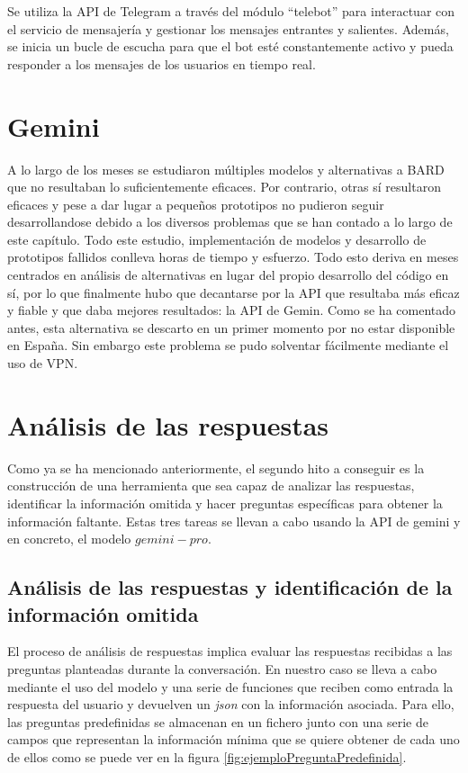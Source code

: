 Se utiliza la API de Telegram a través del módulo ``telebot'' para interactuar con el servicio de mensajería y gestionar los mensajes entrantes y salientes. Además, se inicia un bucle de escucha para que el bot esté constantemente activo y pueda responder a los mensajes de los usuarios en tiempo real.

\section{Gemini}

A lo largo de los meses se estudiaron múltiples modelos y alternativas a BARD que no resultaban lo suficientemente eficaces. Por contrario, otras sí resultaron eficaces y pese a dar lugar a pequeños prototipos no pudieron seguir desarrollandose debido a los diversos problemas que se han contado a lo largo de este capítulo. Todo este estudio, implementación de modelos y desarrollo de prototipos fallidos conlleva horas de tiempo y esfuerzo. Todo esto deriva en meses centrados en análisis de alternativas en lugar del propio desarrollo del código en sí, por lo que finalmente hubo que decantarse por la API que resultaba más eficaz y fiable y que daba mejores resultados: la API de Gemin. Como se ha comentado antes, esta alternativa se descarto en un primer momento por no estar disponible en España. Sin embargo este problema se pudo solventar fácilmente mediante el uso de VPN. 

\section{Análisis de las respuestas}
Como ya se ha mencionado anteriormente, el segundo hito a conseguir es la construcción de una herramienta que sea capaz de analizar las respuestas, identificar la información omitida y hacer preguntas específicas para obtener la información faltante. Estas tres tareas se llevan a cabo usando la API de gemini y en concreto, el modelo $gemini-pro$. 

\subsection{Análisis de las respuestas y identificación de la información omitida}
El proceso de análisis de respuestas implica evaluar las respuestas recibidas a las preguntas planteadas durante la conversación. En nuestro caso se lleva a cabo mediante el uso del modelo y una serie de funciones que reciben como entrada la respuesta del usuario y devuelven un \textit{json} con la información asociada. Para ello, las preguntas predefinidas se almacenan en un fichero junto con una serie de campos que representan la información mínima que se quiere obtener de cada uno de ellos como se puede ver en la figura \ref{fig:ejemploPreguntaPredefinida}.

